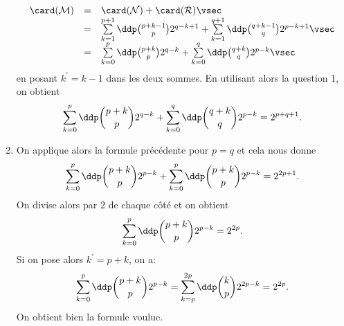 \documentclass[a4paper, 11pt,reqno]{article}
\begin{document}
\begin{correction}
\begin{enumerate}
$$\begin{array}{lll}
\card (\mathcal{M})&=& \card (\mathcal{N})+\card (\mathcal{R})\vsec\\
&=& \sum\limits_{k=1}^{p+1} \ddp \binom{p+k-1}{p}2^{q-k+1}+\sum\limits_{k=1}^{q+1} \ddp \binom{q+k-1}{q}2^{p-k+1}\vsec\\
&=& \sum\limits_{k=0}^{p} \ddp \binom{p+k}{p}2^{q-k}+\sum\limits_{k=0}^{q} \ddp \binom{q+k}{q}2^{p-k}\vsec\\
  \end{array}
$$
en posant $k^{\prime}=k-1$ dans les deux sommes. En utilisant alors la question 1, on obtient
$$\sum\limits_{k=0}^{p} \ddp \binom{p+k}{p}2^{q-k}+\sum\limits_{k=0}^{q} \ddp \binom{q+k}{q}2^{p-k}=2^{p+q+1} .$$
\item On applique alors la formule pr\'ec\'edente pour $p=q$ et cela nous donne
$$ \sum\limits_{k=0}^{p} \ddp \binom{p+k}{p}2^{p-k}+\sum\limits_{k=0}^{p} \ddp \binom{p+k}{p}2^{p-k}=2^{2p+1}  .$$
On divise alors par $2$ de chaque c\^ot\'e et on obtient
$$\sum\limits_{k=0}^{p} \ddp \binom{p+k}{p}2^{p-k}=2^{2p}.$$
Si on pose alors $k^{\prime}= p+k$, on a: 
$$\sum\limits_{k=0}^{p} \ddp \binom{p+k}{p}2^{p-k}=\sum\limits_{k=p}^{2p} \ddp \binom{k}{p}2^{2p-k}=2^{2p}.$$
On obtient bien la formule voulue. 
\end{enumerate}
\end{correction}
\end{document}
